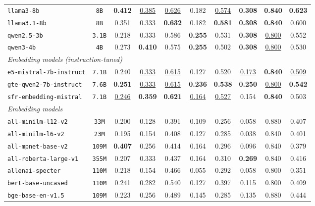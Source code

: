 \documentclass[11pt]{article}
\begin{document}
\begin{table}[htbp]
{\begin{tabular}{lccccccccc}
\texttt{llama3-8b} & \texttt{8B} & \textbf{0.412} & \underline{0.385} & \underline{0.626} & 0.182 & \underline{0.574} & \textbf{0.308} & \textbf{0.840} & \textbf{0.623} \\
\texttt{llama3.1-8b} & \texttt{8B} & \underline{0.351} & 0.333 & \textbf{0.632} & 0.182 & \textbf{0.581} & \textbf{0.308} & \textbf{0.840} & \underline{0.600} \\
\texttt{qwen2.5-3b} & \texttt{3.1B} & 0.218 & 0.333 & 0.586 & \textbf{0.255} & 0.531 & \textbf{0.308} & \underline{0.800} & 0.552 \\
\texttt{qwen3-4b} & \texttt{4B} & 0.273 & \textbf{0.410} & 0.575 & \textbf{0.255} & 0.502 & \textbf{0.308} & \underline{0.800} & 0.530 \\
\midrule
\multicolumn{10}{l}{\textit{Embedding models (instruction-tuned)}} \\
\midrule
\texttt{e5-mistral-7b-instruct} & \texttt{7.1B} & 0.240 & \underline{0.333} & \underline{0.615} & 0.127 & 0.520 & \underline{0.173} & \textbf{0.840} & \underline{0.509} \\
\texttt{gte-qwen2-7b-instruct} & \texttt{7.6B} & \textbf{0.251} & \underline{0.333} & \underline{0.615} & \textbf{0.236} & \textbf{0.538} & \textbf{0.250} & \underline{0.800} & \textbf{0.542} \\
\texttt{sfr-embedding-mistral} & \texttt{7.1B} & \underline{0.246} & \textbf{0.359} & \textbf{0.621} & \underline{0.164} & \underline{0.527} & 0.154 & \textbf{0.840} & 0.503 \\
\midrule
\multicolumn{10}{l}{\textit{Embedding models}} \\
\midrule
\texttt{all-minilm-l12-v2} & \texttt{33M} & 0.200 & 0.128 & 0.391 & 0.109 & 0.256 & 0.058 & 0.880 & 0.407 \\
\texttt{all-minilm-l6-v2} & \texttt{23M} & 0.195 & 0.154 & 0.408 & 0.127 & 0.285 & 0.038 & 0.840 & 0.401 \\
\texttt{all-mpnet-base-v2} & \texttt{109M} & \textbf{0.407} & 0.256 & 0.414 & 0.164 & 0.296 & 0.096 & 0.840 & 0.379 \\
\texttt{all-roberta-large-v1} & \texttt{355M} & 0.207 & 0.333 & 0.437 & 0.164 & 0.310 & \textbf{0.269} & 0.840 & 0.416 \\
\texttt{allenai-specter} & \texttt{110M} & 0.218 & 0.154 & 0.466 & 0.055 & 0.292 & 0.058 & 0.800 & 0.351 \\
\texttt{bert-base-uncased} & \texttt{110M} & 0.241 & 0.282 & 0.540 & 0.127 & 0.397 & 0.115 & 0.800 & 0.409 \\
\texttt{bge-base-en-v1.5} & \texttt{109M} & 0.223 & 0.256 & 0.489 & 0.145 & 0.285 & 0.135 & 0.880 & 0.444 \\

\end{tabular}}
\end{table}
\end{document}
